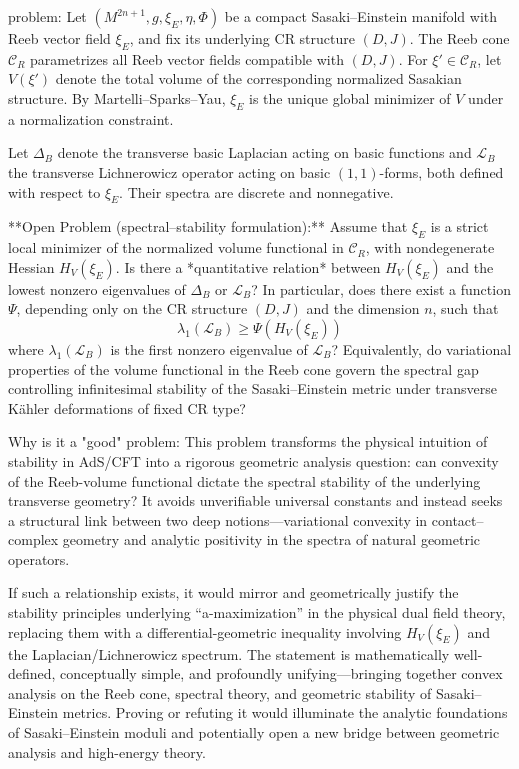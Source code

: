 problem:  
Let $(M^{2n+1}, g, \xi_E, \eta, \Phi)$ be a compact Sasaki–Einstein manifold with Reeb vector field $\xi_E$, and fix its underlying CR structure $(D, J)$.  
The Reeb cone $\mathcal{C}_R$ parametrizes all Reeb vector fields compatible with $(D, J)$.  
For $\xi' \in \mathcal{C}_R$, let $V(\xi')$ denote the total volume of the corresponding normalized Sasakian structure.  
By Martelli–Sparks–Yau, $\xi_E$ is the unique global minimizer of $V$ under a normalization constraint.

Let $\Delta_B$ denote the transverse basic Laplacian acting on basic functions and $\mathcal{L}_B$ the transverse Lichnerowicz operator acting on basic $(1,1)$-forms, both defined with respect to $\xi_E$. Their spectra are discrete and nonnegative.  

**Open Problem (spectral–stability formulation):**  
Assume that $\xi_E$ is a strict local minimizer of the normalized volume functional in $\mathcal{C}_R$, with nondegenerate Hessian $H_V(\xi_E)$.  
Is there a *quantitative relation* between $H_V(\xi_E)$ and the lowest nonzero eigenvalues of $\Delta_B$ or $\mathcal{L}_B$?  
In particular, does there exist a function $\Psi$, depending only on the CR structure $(D,J)$ and the dimension $n$, such that
\[
\lambda_1(\mathcal{L}_B) \geq \Psi(H_V(\xi_E))
\]
where $\lambda_1(\mathcal{L}_B)$ is the first nonzero eigenvalue of $\mathcal{L}_B$?  
Equivalently, do variational properties of the volume functional in the Reeb cone govern the spectral gap controlling infinitesimal stability of the Sasaki–Einstein metric under transverse Kähler deformations of fixed CR type?

Why is it a "good" problem:  
This problem transforms the physical intuition of stability in AdS/CFT into a rigorous geometric analysis question: can convexity of the Reeb-volume functional dictate the spectral stability of the underlying transverse geometry? It avoids unverifiable universal constants and instead seeks a structural link between two deep notions—variational convexity in contact–complex geometry and analytic positivity in the spectra of natural geometric operators.  

If such a relationship exists, it would mirror and geometrically justify the stability principles underlying “a-maximization” in the physical dual field theory, replacing them with a differential-geometric inequality involving $H_V(\xi_E)$ and the Laplacian/Lichnerowicz spectrum. The statement is mathematically well-defined, conceptually simple, and profoundly unifying—bringing together convex analysis on the Reeb cone, spectral theory, and geometric stability of Sasaki–Einstein metrics. Proving or refuting it would illuminate the analytic foundations of Sasaki–Einstein moduli and potentially open a new bridge between geometric analysis and high-energy theory.